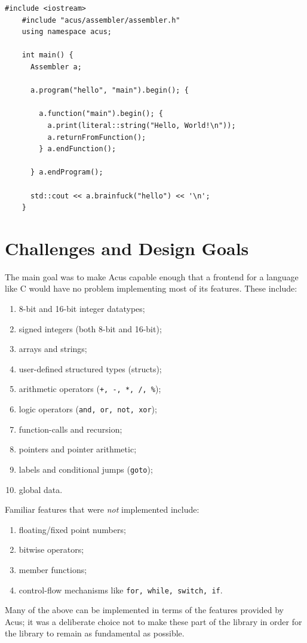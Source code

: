 \begin{lstfloat}[H]
  \begin{lstlisting}[style=cpp]
    #include <iostream>
    #include "acus/assembler/assembler.h"
    using namespace acus;

    int main() {
      Assembler a;

      a.program("hello", "main").begin(); {

        a.function("main").begin(); {
          a.print(literal::string("Hello, World!\n"));
          a.returnFromFunction();
        } a.endFunction();

      } a.endProgram();
      
      std::cout << a.brainfuck("hello") << '\n';
    }
  \end{lstlisting}
  \caption{C++ code that calls into the Acus-library to produce an executable that outputs BF source code for a \emph{Hello World} program.}
  \label{lst:acushello}
\end{lstfloat}


\section{Challenges and Design Goals}
The main goal was to make Acus capable enough that a frontend for a language like C would have no problem implementing most of its features. These include:
%
\begin{enumerate} \itemsep0em 
\item 8-bit and 16-bit integer datatypes;
\item signed integers (both 8-bit and 16-bit);
\item arrays and strings;
\item user-defined structured types (structs);
\item arithmetic operators (\texttt{+, -, *, /, \%});
\item logic operators (\texttt{and, or, not, xor});
\item function-calls and recursion;
\item pointers and pointer arithmetic;
\item labels and conditional jumps (\texttt{goto});
\item global data.
\end{enumerate}
%
Familiar features that were \emph{not} implemented include:
\begin{enumerate} \itemsep0em 
\item floating/fixed point numbers;
\item bitwise operators;
\item member functions;
\item control-flow mechanisms like \texttt{for, while, switch, if}.
\end{enumerate}
%
Many of the above can be implemented in terms of the features provided by Acus; it was a deliberate choice not to make these part of the library in order for the library to remain as fundamental as possible.

